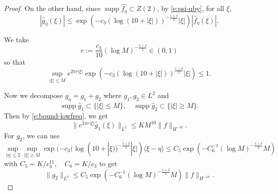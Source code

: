 \documentclass[reqno,12pt,letterpaper]{amsart}
\numberwithin{equation}{section}
\numberwithin{prop}{section}
\DeclareMathOperator{\supp}{supp}
\begin{document}
\begin{proof}
On the other hand, since $\supp\widehat{f_\eta}\subset Z(2)$, by \eqref{e:psi-uby}, for all $\xi$,
\begin{equation*}
|\widehat{g}_\eta(\xi)|
\leq
\exp(-c_3(\log(10+|\xi|))^{-\frac{1+\delta}{2}}|\xi|)|\widehat{f}_\eta(\xi)|.
\end{equation*}

We take 
\begin{equation*}
r:=\frac{c_3}{10}(\log M)^{-\frac{1+\delta}{2}}\in(0,1)
\end{equation*}
so that
\begin{equation}
\label{e:bound-lowfreq}
\sup_{|\xi|\leq M}e^{2\pi r|\xi|}
\exp(-c_3(\log(10+|\xi|))^{\frac{1+\delta}{2}}|\xi|)\leq1.
\end{equation}

Now we decompose $g_\eta=g_1+g_2$ where $g_1,g_2\in L^2$ and
\begin{equation*}
\supp\widehat{g}_1\subset\{|\xi|\leq M\},\quad
\supp\widehat{g}_2\subset\{|\xi|\geq M\}.
\end{equation*}
Then by \eqref{e:bound-lowfreq}, we get
\begin{equation}
\label{e:bound-g1-exp}
\|e^{2\pi r|\xi|}\widehat{g}_1(\xi)\|_{L^2}\leq KM^{10}\|f\|_{H^{-10}}.
\end{equation}
For $g_2$, we can use
\begin{equation*}
\sup_{|\eta|\leq2}\sup_{|\xi|\geq M}
\exp(-c_3(\log(10+|\xi))^{-\frac{1+\delta}{2}}|\xi|)\langle\xi-\eta\rangle
\leq C_5\exp(-C_6^{-1}(\log M)^{-\frac{1+\delta}{2}}M)
\end{equation*}
with $C_5=K/c_3^{11},\quad C_6=K/c_3$ to get
\begin{equation}
\label{e:g2-b}
\|g_2\|_{L^2}\leq C_5\exp(-C_6^{-1}(\log M)^{-\frac{1+\delta}{2}}M)\|f\|_{H^{-10}}.
\end{equation}


\end{proof}
\end{document}
